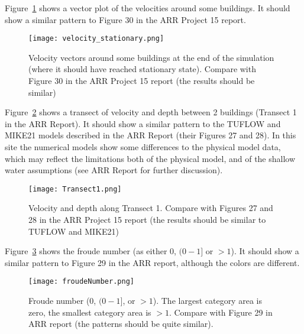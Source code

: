 \documentclass{article}
\begin{document}
Figure~\ref{fig:stationary_vel} shows a vector plot of the velocities around some buildings. It should
show a similar pattern to Figure 30 in the ARR Project 15 report.

\begin{figure}[h]
\begin{center}
\texttt{[image: velocity\_stationary.png]}
\end{center}
\caption{Velocity vectors around some buildings at the end of the simulation
(where it should have reached stationary state). Compare with Figure 30 in the ARR Project 15 report (the results should be similar)}
\label{fig:stationary_vel}
\end{figure}








Figure~\ref{fig:transect1} shows a transect of velocity and depth between 2 buildings (Transect
1 in the ARR Report).  It should show a similar pattern to the TUFLOW and
MIKE21 models described in the ARR Report (their Figures 27 and 28).  In this
site the numerical models show some differences to the physical model data,
which may reflect the limitations both of the physical model, and of the
shallow water assumptions (see ARR Report for further discussion).
\begin{figure}
\texttt{[image: Transect1.png]}
\caption{Velocity and depth along Transect 1. Compare with Figures 27 and 28 
in the ARR Project 15 report (the results should be similar to TUFLOW and
MIKE21)}
\label{fig:transect1}
\end{figure}

Figure~\ref{fig:froude} shows the froude number (as either 0, $(0-1]$ or $>1$).  It
should show a similar pattern to Figure 29 in the ARR report, although the
colors are different. 
\begin{figure}
\center
\texttt{[image: froudeNumber.png]}
\caption{Froude number (0, $(0-1]$, or $>1$). The largest category area is
zero, the smallest category area is $>1$. Compare with Figure 29 in ARR report
(the patterns should be quite similar).}
\label{fig:froude}
\end{figure}
\end{document}
